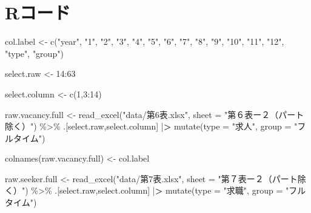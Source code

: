 \documentclass[
]{book}
\newenvironment{Shaded}{\begin{snugshade}}{\end{snugshade}}
\newcommand{\AttributeTok}[1]{\textcolor[rgb]{0.77,0.63,0.00}{#1}}
\newcommand{\DecValTok}[1]{\textcolor[rgb]{0.00,0.00,0.81}{#1}}
\newcommand{\ErrorTok}[1]{\textcolor[rgb]{0.64,0.00,0.00}{\textbf{#1}}}
\newcommand{\FunctionTok}[1]{\textcolor[rgb]{0.00,0.00,0.00}{#1}}
\newcommand{\NormalTok}[1]{#1}
\newcommand{\OtherTok}[1]{\textcolor[rgb]{0.56,0.35,0.01}{#1}}
\newcommand{\SpecialCharTok}[1]{\textcolor[rgb]{0.00,0.00,0.00}{#1}}
\newcommand{\StringTok}[1]{\textcolor[rgb]{0.31,0.60,0.02}{#1}}
\begin{document}
\hypertarget{rux30b3ux30fcux30c9}{%
\section{Rコード}\label{rux30b3ux30fcux30c9}}

\begin{Shaded}
\begin{Highlighting}[]
\NormalTok{col.label }\OtherTok{\textless{}{-}} 
   \FunctionTok{c}\NormalTok{(}\StringTok{"year"}\NormalTok{,}
     \StringTok{"1"}\NormalTok{,}
     \StringTok{"2"}\NormalTok{,}
     \StringTok{"3"}\NormalTok{,}
     \StringTok{"4"}\NormalTok{,}
     \StringTok{"5"}\NormalTok{,}
     \StringTok{"6"}\NormalTok{,}
     \StringTok{"7"}\NormalTok{,}
     \StringTok{"8"}\NormalTok{,}
     \StringTok{"9"}\NormalTok{,}
     \StringTok{"10"}\NormalTok{,}
     \StringTok{"11"}\NormalTok{,}
     \StringTok{"12"}\NormalTok{,}
     \StringTok{"type"}\NormalTok{,}
     \StringTok{"group"}\NormalTok{)}

\NormalTok{select.raw }\OtherTok{\textless{}{-}} \DecValTok{14}\SpecialCharTok{:}\DecValTok{63}

\NormalTok{select.column }\OtherTok{\textless{}{-}} \FunctionTok{c}\NormalTok{(}\DecValTok{1}\NormalTok{,}\DecValTok{3}\SpecialCharTok{:}\DecValTok{14}\NormalTok{)}

\NormalTok{raw.vacancy.full }\OtherTok{\textless{}{-}}
  \FunctionTok{read\_excel}\NormalTok{(}\StringTok{"data/第6表.xlsx"}\NormalTok{,}
             \AttributeTok{sheet =} \StringTok{"第６表ー２（パート除く）"}\NormalTok{) }\SpecialCharTok{\%\textgreater{}\%}
\NormalTok{  .[select.raw,select.column] }\SpecialCharTok{|}\ErrorTok{\textgreater{}} 
  \FunctionTok{mutate}\NormalTok{(}\AttributeTok{type =} \StringTok{"求人"}\NormalTok{,}
         \AttributeTok{group =} \StringTok{"フルタイム"}\NormalTok{)}

\FunctionTok{colnames}\NormalTok{(raw.vacancy.full) }\OtherTok{\textless{}{-}}\NormalTok{ col.label}

\NormalTok{raw.seeker.full }\OtherTok{\textless{}{-}}
  \FunctionTok{read\_excel}\NormalTok{(}\StringTok{"data/第7表.xlsx"}\NormalTok{,}
             \AttributeTok{sheet =} \StringTok{"第７表ー２（パート除く）"}\NormalTok{) }\SpecialCharTok{\%\textgreater{}\%}
\NormalTok{  .[select.raw,select.column] }\SpecialCharTok{|}\ErrorTok{\textgreater{}} 
  \FunctionTok{mutate}\NormalTok{(}\AttributeTok{type =} \StringTok{"求職"}\NormalTok{,}
         \AttributeTok{group =} \StringTok{"フルタイム"}\NormalTok{)}


\end{Highlighting}
\end{Shaded}
\end{document}
